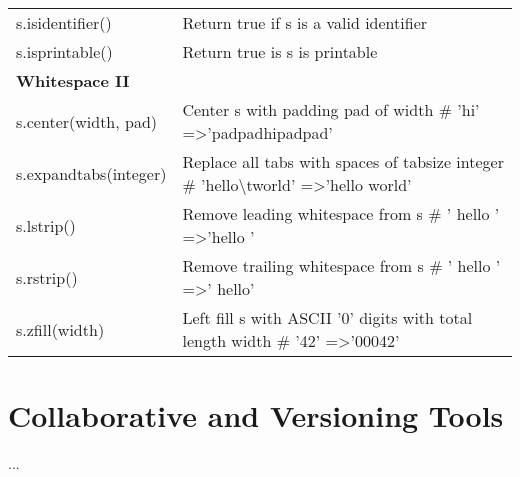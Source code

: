 \documentclass[a4paper,11pt]{book}
\numberwithin{figure}{chapter}
\numberwithin{table}{chapter}
\begin{document}
\begin{appendices}
\begin{table}[!htbp]
\begin{tabular}{lp{12cm}}
s.isidentifier()         & Return true if s is a valid identifier                                                                                                          \\
s.isprintable()          & Return true is s is printable                                                                                                                   \\ \midrule
\textbf{Whitespace II}            &                                                                                                                                                 \\ \midrule
s.center(width, pad)     & Center s with padding pad of width \# 'hi' =\textgreater 'padpadhipadpad'                                                                       \\
s.expandtabs(integer)    & Replace all tabs with spaces of tabsize integer \# 'hello\textbackslash{}tworld' =\textgreater 'hello world'                                    \\
s.lstrip()               & Remove leading whitespace from s \# ' hello ' =\textgreater 'hello '                                                                            \\
s.rstrip()               & Remove trailing whitespace from s \# ' hello ' =\textgreater ' hello'                                                                           \\
s.zfill(width)           & Left fill s with ASCII '0' digits with total length width \# '42' =\textgreater '00042'  
   \\                                                      
\bottomrule
\end{tabular}
\end{table}
\clearpage

\chapter{Collaborative and Versioning Tools}

...

\end{appendices}
\end{document}
